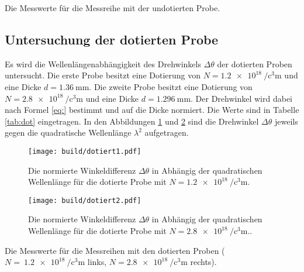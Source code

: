 \begin{table}
	\centering
	\caption{Die Messwerte für die Messreihe mit der undotierten Probe.}
	
	\label{tab:undot}
\end{table}

\subsection{Untersuchung der dotierten Probe}
Es wird die Wellenlängenabhängigkeit des Drehwinkels $\Delta\theta$ der dotierten Proben untersucht. Die erste Probe besitzt eine Dotierung von $N=\SI{1.2e18}{\per\cubic\centi\metre}$ und eine Dicke $d=\SI{1.36}{\milli\metre}$. Die zweite Probe besitzt eine Dotierung von $N=\SI{2.8e18}{\per\cubic\centi\metre}$ und eine Dicke $d=\SI{1.296}{\milli\metre}$. Der Drehwinkel wird dabei nach Formel \eqref{eq:} bestimmt und auf die Dicke normiert. Die Werte sind in Tabelle \ref{tab:dot} eingetragen. In den Abbildungen \ref{fig:dot1} und \ref{fig:dot2} sind die Drehwinkel $\Delta\theta$ jeweils gegen die quadratische Wellenlänge $\lambda^2$ aufgetragen.

\begin{figure}
	\centering
	\texttt{[image: build/dotiert1.pdf]}
	\caption{Die normierte Winkeldifferenz $\Delta\theta$ in Abhängig der quadratischen Wellenlänge für die dotierte Probe mit $N=\SI{1.2e18}{\per\cubic\centi\metre}$.}
	\label{fig:dot1}
\end{figure}

\begin{figure}
	\centering
	\texttt{[image: build/dotiert2.pdf]}
	\caption{Die normierte Winkeldifferenz $\Delta\theta$ in Abhängig der quadratischen Wellenlänge für die dotierte Probe mit $N=\SI{2.8e18}{\per\cubic\centi\metre}$..}
	\label{fig:dot2}
\end{figure}

\begin{table}
	\centering
	\caption{Die Messwerte für die Messreihen mit den dotierten Proben ($N=~\SI{1.2e18}{\per\cubic\centi\metre}$ links, $N=\SI{2.8e18}{\per\cubic\centi\metre}$ rechts).}
	
	
	\label{tab:dot}
\end{table}

